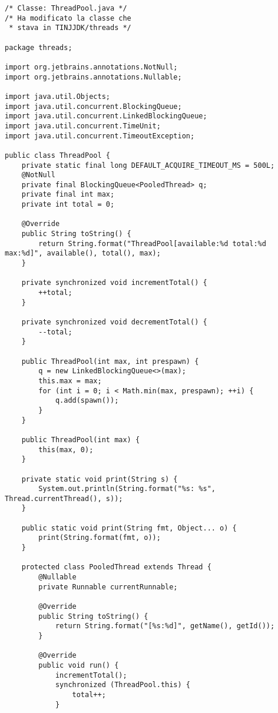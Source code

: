 \begin{lstlisting}[basicstyle=\small,]
/* Classe: ThreadPool.java */
/* Ha modificato la classe che
 * stava in TINJJDK/threads */

package threads;

import org.jetbrains.annotations.NotNull;
import org.jetbrains.annotations.Nullable;

import java.util.Objects;
import java.util.concurrent.BlockingQueue;
import java.util.concurrent.LinkedBlockingQueue;
import java.util.concurrent.TimeUnit;
import java.util.concurrent.TimeoutException;

public class ThreadPool {
    private static final long DEFAULT_ACQUIRE_TIMEOUT_MS = 500L;
    @NotNull
    private final BlockingQueue<PooledThread> q;
    private final int max;
    private int total = 0;

    @Override
    public String toString() {
        return String.format("ThreadPool[available:%d total:%d max:%d]", available(), total(), max);
    }

    private synchronized void incrementTotal() {
        ++total;
    }

    private synchronized void decrementTotal() {
        --total;
    }

    public ThreadPool(int max, int prespawn) {
        q = new LinkedBlockingQueue<>(max);
        this.max = max;
        for (int i = 0; i < Math.min(max, prespawn); ++i) {
            q.add(spawn());
        }
    }

    public ThreadPool(int max) {
        this(max, 0);
    }

    private static void print(String s) {
        System.out.println(String.format("%s: %s", Thread.currentThread(), s));
    }

    public static void print(String fmt, Object... o) {
        print(String.format(fmt, o));
    }

    protected class PooledThread extends Thread {
        @Nullable
        private Runnable currentRunnable;

        @Override
        public String toString() {
            return String.format("[%s:%d]", getName(), getId());
        }

        @Override
        public void run() {
            incrementTotal();
            synchronized (ThreadPool.this) {
                total++;
            }


\end{lstlisting}
